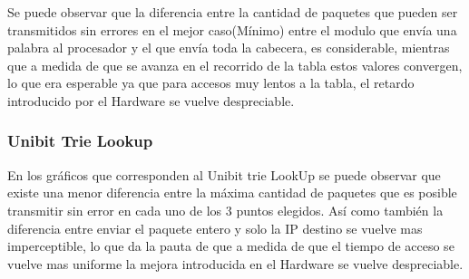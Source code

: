 Se puede observar que la diferencia entre la cantidad de paquetes que pueden ser transmitidos sin errores en el mejor caso(Mínimo) entre el modulo que envía una palabra al procesador y el que envía toda la cabecera, es considerable, mientras que a medida de que se avanza en el recorrido de la tabla estos valores convergen, lo que era esperable ya que para accesos muy lentos a la tabla, el retardo introducido por el Hardware se vuelve despreciable.

\newpage
\subsubsection{Unibit Trie Lookup}

En los gráficos que corresponden al Unibit trie LookUp se puede observar que existe una menor diferencia entre la máxima cantidad de paquetes que es posible transmitir sin error en cada uno de los 3 puntos elegidos. Así como también la diferencia entre enviar el paquete entero y solo la IP destino se vuelve mas imperceptible, lo que da la pauta de que a medida de que el tiempo de acceso se vuelve mas uniforme la mejora introducida en el Hardware se vuelve despreciable.

